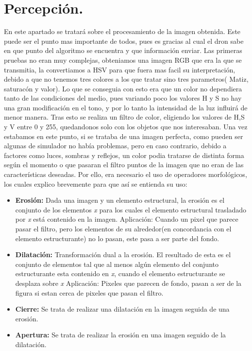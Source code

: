 \section{Percepci\'on.}
\hspace{1cm} En este apartado se tratar\'a sobre el procesamiento de la imagen obtenida. Este puede ser el punto mas importante de todos, pues es gracias al cual el dron sabe en que punto del algoritmo se encuentra y que informaci\'on enviar. Las primeras pruebas no eran muy complejas, obteniamos una imagen RGB que era la que se transmitia, la convertiamos a HSV para que fuera mas facil su interpretaci\'on, debido a que no tenemos tres colores a los que tratar sino tres parametros( Matiz, saturac\'on y valor). Lo que se conseguia con esto era que un color no dependiera tanto de las condiciones del medio, pues variando poco los valores H y S no hay una gran modificaci\'on en el tono, y por lo tanto la intensidad de la luz influir\'a de menor manera. Tras esto se realiza un filtro de color, eligiendo los valores de H,S y V entre 0 y 255, quedandonos solo con los objetos que nos interesaban. Una vez estabamos en este punto, si se trataba de una imagen perfecta, como pueden ser algunas de simulador no hab\'ia problemas, pero en caso contrario, debido a factores como luces, sombras y reflejos, un color podia tratarse de distinta forma seg\'un el momento o que pasaran el filtro puntos de la imagen que no eran de las caracter\'isticas deseadas. Por ello,  era necesario el uso de operadores morfol\'ogicos, los cuales explico brevemente para que as\'i se entienda su uso: 
\begin{itemize}
	\item \textbf{Erosi\'on:} Dada una imagen y un elemento estructural, la erosi\'on es el conjunto de los elementos \textit{x} para los cuales el elemento estructural trasladado por \textit{x} est\'a contenido en la imagen. 
	\newline\hspace{1 cm} Aplicaci\'on: Cuando un pixel que parece pasar el filtro, pero los elementos de su alrededor(en concordancia con el elemento estructurante) no lo pasan, este pasa a ser parte del fondo. 
	\item \textbf{Dilataci\'on:} Transformaci\'on dual a la erosi\'on. El resultado de esta es el conjunto de elementos tal que al menos alg\'un elemento del conjunto estructurante esta contenido en \textit{x}, cuando el elemento estructurante se desplaza sobre \textit{x}
	\newline\hspace{1 cm} Aplicaci\'on: Pixeles que parecen de fondo, pasan a ser de la figura si estan cerca de pixeles que pasan el filtro.
	\item \textbf{Cierre:} Se trata de realizar una dilataci\'on en la imagen seguida de una erosi\'on.
	\item \textbf{Apertura:} Se trata de realizar la erosi\'on en una imagen seguido de la dilataci\'on.
\end{itemize}

